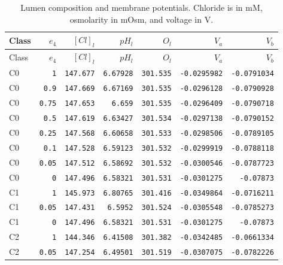 \begingroup\footnotesize
\setlength{\tabcolsep}{3pt}
\begin{longtable}{lrrrrrr}
\caption{Lumen composition and membrane potentials. Chloride is in mM, osmolarity in mOsm, and voltage in V.}\\
\toprule
Class & $e_4$ & $[Cl]_l$ & $pH_l$ & $O_l$ & $V_a$ & $V_b$ \\
\midrule\endfirsthead
\toprule
Class & $e_4$ & $[Cl]_l$ & $pH_l$ & $O_l$ & $V_a$ & $V_b$ \\
\midrule\endhead
\bottomrule\endfoot
C0 & \texttt{1} & \texttt{147.677} & \texttt{6.67928} & \texttt{301.535} & \texttt{-0.0295982} & \texttt{-0.0791034} \\
C0 & \texttt{0.9} & \texttt{147.669} & \texttt{6.67169} & \texttt{301.535} & \texttt{-0.0296128} & \texttt{-0.0790928} \\
C0 & \texttt{0.75} & \texttt{147.653} & \texttt{6.659} & \texttt{301.535} & \texttt{-0.0296409} & \texttt{-0.0790718} \\
C0 & \texttt{0.5} & \texttt{147.619} & \texttt{6.63427} & \texttt{301.534} & \texttt{-0.0297138} & \texttt{-0.0790152} \\
C0 & \texttt{0.25} & \texttt{147.568} & \texttt{6.60658} & \texttt{301.533} & \texttt{-0.0298506} & \texttt{-0.0789105} \\
C0 & \texttt{0.1} & \texttt{147.528} & \texttt{6.59123} & \texttt{301.532} & \texttt{-0.0299919} & \texttt{-0.0788118} \\
C0 & \texttt{0.05} & \texttt{147.512} & \texttt{6.58692} & \texttt{301.532} & \texttt{-0.0300546} & \texttt{-0.0787723} \\
C0 & \texttt{0} & \texttt{147.496} & \texttt{6.58321} & \texttt{301.531} & \texttt{-0.0301275} & \texttt{-0.07873} \\
C1 & \texttt{1} & \texttt{145.973} & \texttt{6.80765} & \texttt{301.416} & \texttt{-0.0349864} & \texttt{-0.0716211} \\
C1 & \texttt{0.05} & \texttt{147.431} & \texttt{6.5952} & \texttt{301.524} & \texttt{-0.0305548} & \texttt{-0.0785273} \\
C1 & \texttt{0} & \texttt{147.496} & \texttt{6.58321} & \texttt{301.531} & \texttt{-0.0301275} & \texttt{-0.07873} \\
C2 & \texttt{1} & \texttt{144.346} & \texttt{6.41508} & \texttt{301.382} & \texttt{-0.0342485} & \texttt{-0.0661334} \\
C2 & \texttt{0.05} & \texttt{147.254} & \texttt{6.49501} & \texttt{301.519} & \texttt{-0.0307075} & \texttt{-0.0782226} \\

\end{longtable}
